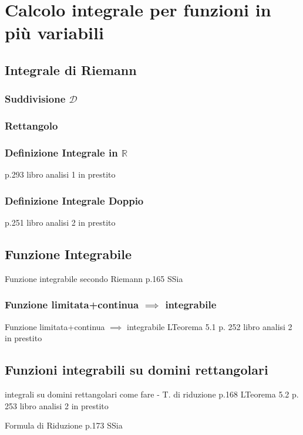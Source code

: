 \documentclass{article}  %
\begin{document}
\section{Calcolo integrale per funzioni in più variabili}
\subsection{Integrale di Riemann}
\subsubsection{Suddivisione $\mathcal{D}$}
\subsubsection{Rettangolo}
\subsubsection{Definizione Integrale in $\mathbb{R}$}
p.293 libro analisi 1 in prestito
\subsubsection{Definizione Integrale Doppio}
p.251 libro analisi 2 in prestito
\subsection{Funzione Integrabile}
\begin{theorem}{Funzione integrabile secondo Riemann p.165}
	SSia
\end{theorem}
\subsubsection{Funzione limitata+continua $\implies$ integrabile}
\begin{theorem}{Funzione limitata+continua $\implies$ integrabile}
	LTeorema 5.1 p. 252 libro analisi 2 in prestito
\end{theorem}
\subsection{Funzioni integrabili su domini rettangolari}
\begin{theorem}{integrali su domini rettangolari come fare - T. di riduzione p.168}
	LTeorema 5.2 p. 253 libro analisi 2 in prestito
\end{theorem}

\begin{theorem}{Formula di Riduzione p.173}
	SSia
\end{theorem}
\end{document}
